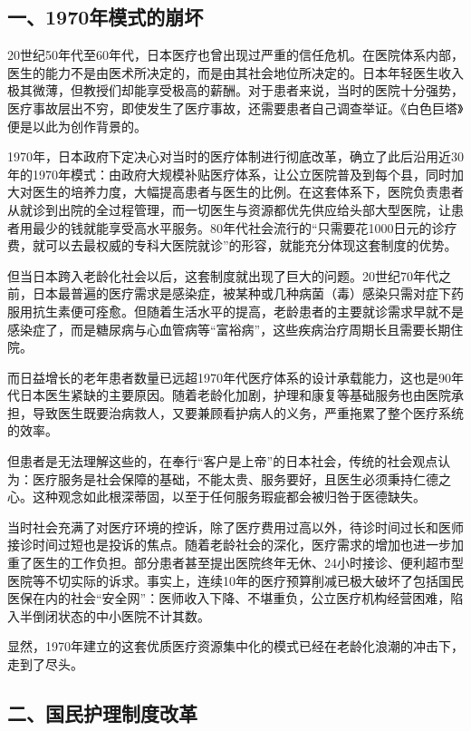 \subsection{一、1970年模式的崩坏}

20世纪50年代至60年代，日本医疗也曾出现过严重的信任危机。在医院体系内部，医生的能力不是由医术所决定的，而是由其社会地位所决定的。日本年轻医生收入极其微薄，但教授们却能享受极高的薪酬。对于患者来说，当时的医院十分强势，医疗事故层出不穷，即使发生了医疗事故，还需要患者自己调查举证。《白色巨塔》便是以此为创作背景的。

1970年，日本政府下定决心对当时的医疗体制进行彻底改革，确立了此后沿用近30年的1970年模式：由政府大规模补贴医疗体系，让公立医院普及到每个县，同时加大对医生的培养力度，大幅提高患者与医生的比例。在这套体系下，医院负责患者从就诊到出院的全过程管理，而一切医生与资源都优先供应给头部大型医院，让患者用最少的钱就能享受高水平服务。80年代社会流行的“只需要花1000日元的诊疗费，就可以去最权威的专科大医院就诊”的形容，就能充分体现这套制度的优势。

但当日本跨入老龄化社会以后，这套制度就出现了巨大的问题。20世纪70年代之前，日本最普遍的医疗需求是感染症，被某种或几种病菌（毒）感染只需对症下药服用抗生素便可痊愈。但随着生活水平的提高，老龄患者的主要就诊需求早就不是感染症了，而是糖尿病与心血管病等“富裕病”，这些疾病治疗周期长且需要长期住院。

而日益增长的老年患者数量已远超1970年代医疗体系的设计承载能力，这也是90年代日本医生紧缺的主要原因。随着老龄化加剧，护理和康复等基础服务也由医院承担，导致医生既要治病救人，又要兼顾看护病人的义务，严重拖累了整个医疗系统的效率。

但患者是无法理解这些的，在奉行“客户是上帝”的日本社会，传统的社会观点认为：医疗服务是社会保障的基础，不能太贵、服务要好，且医生必须秉持仁德之心。这种观念如此根深蒂固，以至于任何服务瑕疵都会被归咎于医德缺失。

当时社会充满了对医疗环境的控诉，除了医疗费用过高以外，待诊时间过长和医师接诊时间过短也是投诉的焦点。随着老龄社会的深化，医疗需求的增加也进一步加重了医生的工作负担。部分患者甚至提出医院终年无休、24小时接诊、便利超市型医院等不切实际的诉求。事实上，连续10年的医疗预算削减已极大破坏了包括国民医保在内的社会“安全网”：医师收入下降、不堪重负，公立医疗机构经营困难，陷入半倒闭状态的中小医院不计其数。

显然，1970年建立的这套优质医疗资源集中化的模式已经在老龄化浪潮的冲击下，走到了尽头。

\subsection{二、国民护理制度改革}

